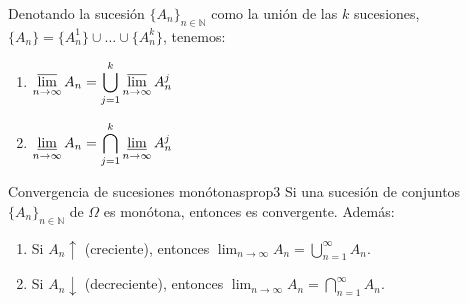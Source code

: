 \begin{observacion}
Denotando la sucesión $\{A_n\}_{n \in \mathbb{N}}$ como la unión de las $k$ sucesiones, $\{A_n\} = \{A_n^1\} \cup \dots \cup \{A_n^k\}$, tenemos:
\begin{enumerate}[label=\alph*)]
    \item $\displaystyle \varlimsup_{n \to \infty} A_n = \bigcup_{j=1}^k \varlimsup_{n \to \infty} A_n^j$
    \item $\displaystyle \varliminf_{n \to \infty} A_n = \bigcap_{j=1}^k \varliminf_{n \to \infty} A_n^j$
\end{enumerate}
\end{observacion}

\newpage
\begin{proposicion}{Convergencia de sucesiones monótonas}{prop3}
Si una sucesión de conjuntos $\{A_n\}_{n \in \mathbb{N}}$ de $\Omega$ es monótona, entonces es convergente. Además:
\begin{enumerate}[label=\alph*)]
    \item Si $A_n \uparrow$ (creciente), entonces $\displaystyle \lim_{n \to \infty} A_n = \bigcup_{n=1}^\infty A_n$.
    \item Si $A_n \downarrow$ (decreciente), entonces $\displaystyle \lim_{n \to \infty} A_n = \bigcap_{n=1}^\infty A_n$.
\end{enumerate}
\end{proposicion}

